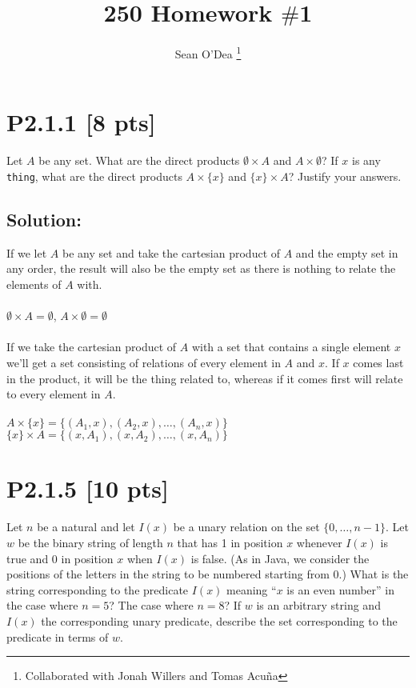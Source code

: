 \documentclass[12pt]{article}
\title{250 Homework $\#$1}
\author{Sean O'Dea \footnote{Collaborated with Jonah Willers and Tomas Acu\~na}}
\begin{document}
\maketitle

\section*{\textbf{P2.1.1} [8 pts]}
Let $A$ be any set. What are the direct products $\emptyset \times A$ and $A \times \emptyset$? If $x$ is any \texttt{thing}, what are the direct products $A \times \{x\}$ and $\{x\} \times A$? Justify your answers.



\subsection*{\textbf{Solution:}}
If we let $A$ be any set and take the cartesian product of $A$ and the empty set in any order, the result will also be the empty set as there is nothing to relate the elements of $A$ with. \\\\
$\emptyset \times A = \emptyset$, $A \times \emptyset = \emptyset$ \\\\
If we take the cartesian product of $A$ with a set that contains a single element $x$ we'll get a set consisting of relations of every element in $A$ and $x$. If $x$ comes last in the product, it will be the thing related to, whereas if it comes first will relate to every element in $A$. \\\\
$A \times \{x\} = \{(A_{1}, x), (A_{2}, x),\ldots , (A_{n}, x)\}$\\
$\{x\} \times A = \{(x, A_{1}), (x, A_{2}), \ldots , (x, A_{n})\}$



\newpage
\section*{\textbf{P2.1.5} [10 pts]}
Let $n$ be a natural and let $I(x)$ be a unary relation on the set $\{0, \ldots , n - 1\}$. Let $w$ be the binary string of length $n$ that has 1 in position $x$ whenever $I(x)$ is true and 0 in position $x$ when $I(x)$ is false. (As in Java, we consider the positions of the letters in the string to be numbered starting from 0.) What is the string corresponding to the predicate $I(x)$ meaning “$x$ is an even number” in the case where $n = 5$? The case where $n = 8$? If $w$ is an arbitrary string and $I(x)$ the corresponding unary predicate, describe the set corresponding to the predicate in terms of $w$.
\end{document}
